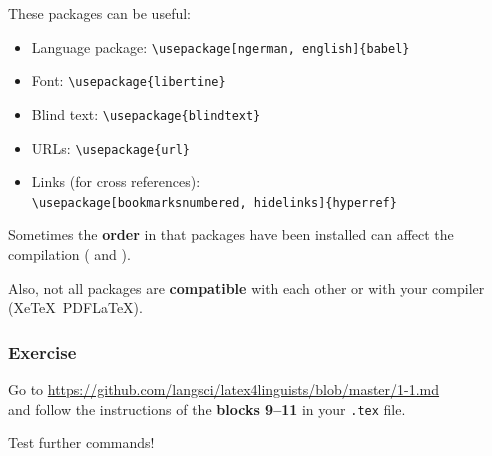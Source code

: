 \begin{frame}[fragile]

These packages can be useful:
\begin{itemize}


\item Language package:  \hfill 
\lstinline|\usepackage[ngerman, english]{babel}|


\item Font:  \hfill 
\lstinline|\usepackage{libertine}|

\item Blind text:  \hfill 
\lstinline|\usepackage{blindtext}|

\item URLs:  \hfill 
\lstinline|\usepackage{url}|

\item Links (\fe for cross references):  \\
\hfill 
\lstinline|\usepackage[bookmarksnumbered, hidelinks]{hyperref}|
\end{itemize}

Sometimes the \textbf{order} in that packages have been installed can affect the compilation (\fe {} and ).

\bigskip 

Also, not all packages are \textbf{compatible} with each other or with your compiler (Xe\TeX\ \vs PDF\LaTeX ).

\end{frame}


\begin{frame}[fragile]
\frametitle{Exercise}


Go to \url{https://github.com/langsci/latex4linguists/blob/master/1-1.md}\\
and follow the instructions of the \textbf{blocks 9--11} in your \texttt{.tex} file.

\bigskip 

Test further commands!


\end{frame}


